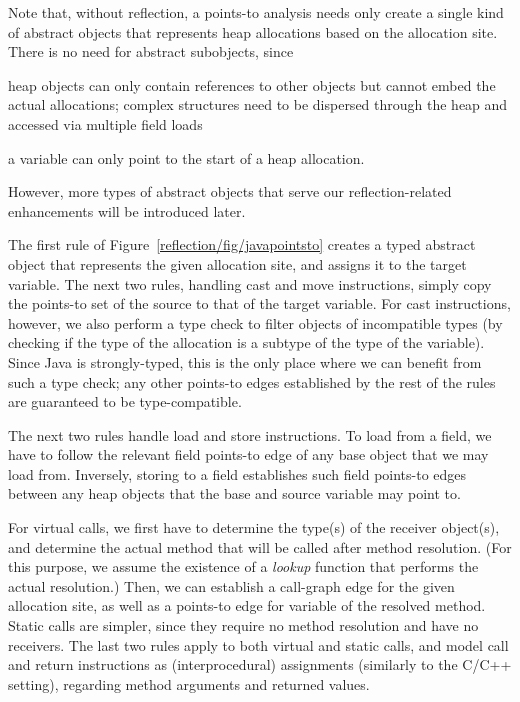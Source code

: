 Note that, without reflection, a points-to analysis needs only create
a single kind of abstract objects that represents heap allocations
based on the allocation site. There is no need for abstract
subobjects, since
\begin{inparaenum}[(i)]
\item heap objects can only contain references to other objects but
  cannot embed the actual allocations; complex structures need to be
  dispersed through the heap and accessed via multiple field loads
\item a variable can only point to the start of a heap allocation.
\end{inparaenum}
However, more types of abstract objects that serve our
reflection-related enhancements will be introduced later.

The first rule of Figure~\ref{reflection/fig/javapointsto} creates a
typed abstract object that represents the given allocation site, and
assigns it to the target variable. The next two rules, handling cast
and move instructions, simply copy the points-to set of the source to
that of the target variable. For cast instructions, however, we also
perform a type check to filter objects of incompatible types (by
checking if the type of the allocation is a subtype of the type of the
variable). Since Java is strongly-typed, this is the only place
where we can benefit from such a type check; any other points-to edges
established by the rest of the rules are guaranteed to be
type-compatible.

The next two rules handle load and store instructions. To load from a
field, we have to follow the relevant field points-to edge of any base
object that we may load from. Inversely, storing to a field
establishes such field points-to edges between any heap objects that
the base and source variable may point to.

For virtual calls, we first have to determine the type(s) of the
receiver object(s), and determine the actual method that will be
called after method resolution. (For this purpose, we assume the
existence of a \emph{lookup} function that performs the actual
resolution.) Then, we can establish a call-graph edge for the given
allocation site, as well as a points-to edge for variable 
of the resolved method. Static calls are simpler, since they require
no method resolution and have no receivers. The last two rules apply
to both virtual and static calls, and model call and return
instructions as (interprocedural) assignments (similarly to the C/C++
setting), regarding method arguments and returned values.



